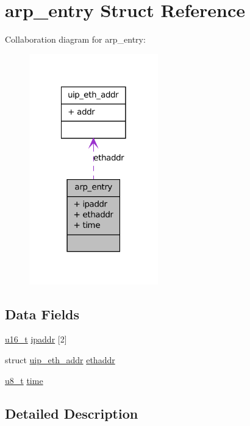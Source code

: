 \hypertarget{structarp__entry}{
\section{arp\_\-entry Struct Reference}
\label{structarp__entry}
}


Collaboration diagram for arp\_\-entry:
\nopagebreak
\begin{figure}[H]
\begin{center}
\leavevmode
\includegraphics[width=158pt]{structarp__entry__coll__graph}
\end{center}
\end{figure}
\subsection*{Data Fields}
\begin{DoxyCompactItemize}
\item 
\hyperlink{group__uipfw_ga77570ac4fcab86864fa1916e55676da2}{u16\_\-t} \hyperlink{structarp__entry_a8a3e31d58737749048a8fa5ed8cd7008}{ipaddr} \mbox{[}2\mbox{]}
\item 
struct \hyperlink{structuip__eth__addr}{uip\_\-eth\_\-addr} \hyperlink{structarp__entry_ab1f6241831c656ebeaaff4952ac6e8e1}{ethaddr}
\item 
\hyperlink{group__uipfw_ga4caecabca98b43919dd11be1c0d4cd8e}{u8\_\-t} \hyperlink{structarp__entry_a6d8bbe3159efcfa7fe1615779a660557}{time}
\end{DoxyCompactItemize}


\subsection{Detailed Description}


